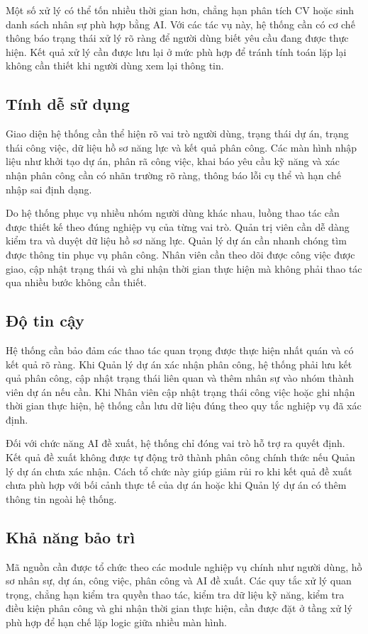 \documentclass[../DoAn.tex]{subfiles}
\begin{document}
Một số xử lý có thể tốn nhiều thời gian hơn, chẳng hạn phân tích CV hoặc sinh danh sách nhân sự phù hợp bằng AI. Với các tác vụ này, hệ thống cần có cơ chế thông báo trạng thái xử lý rõ ràng để người dùng biết yêu cầu đang được thực hiện. Kết quả xử lý cần được lưu lại ở mức phù hợp để tránh tính toán lặp lại không cần thiết khi người dùng xem lại thông tin.

\subsection{Tính dễ sử dụng}
\label{subsection:2.4.4}
Giao diện hệ thống cần thể hiện rõ vai trò người dùng, trạng thái dự án, trạng thái công việc, dữ liệu hồ sơ năng lực và kết quả phân công. Các màn hình nhập liệu như khởi tạo dự án, phân rã công việc, khai báo yêu cầu kỹ năng và xác nhận phân công cần có nhãn trường rõ ràng, thông báo lỗi cụ thể và hạn chế nhập sai định dạng.

Do hệ thống phục vụ nhiều nhóm người dùng khác nhau, luồng thao tác cần được thiết kế theo đúng nghiệp vụ của từng vai trò. Quản trị viên cần dễ dàng kiểm tra và duyệt dữ liệu hồ sơ năng lực. Quản lý dự án cần nhanh chóng tìm được thông tin phục vụ phân công. Nhân viên cần theo dõi được công việc được giao, cập nhật trạng thái và ghi nhận thời gian thực hiện mà không phải thao tác qua nhiều bước không cần thiết.

\subsection{Độ tin cậy}
\label{subsection:2.4.5}
Hệ thống cần bảo đảm các thao tác quan trọng được thực hiện nhất quán và có kết quả rõ ràng. Khi Quản lý dự án xác nhận phân công, hệ thống phải lưu kết quả phân công, cập nhật trạng thái liên quan và thêm nhân sự vào nhóm thành viên dự án nếu cần. Khi Nhân viên cập nhật trạng thái công việc hoặc ghi nhận thời gian thực hiện, hệ thống cần lưu dữ liệu đúng theo quy tắc nghiệp vụ đã xác định.

Đối với chức năng AI đề xuất, hệ thống chỉ đóng vai trò hỗ trợ ra quyết định. Kết quả đề xuất không được tự động trở thành phân công chính thức nếu Quản lý dự án chưa xác nhận. Cách tổ chức này giúp giảm rủi ro khi kết quả đề xuất chưa phù hợp với bối cảnh thực tế của dự án hoặc khi Quản lý dự án có thêm thông tin ngoài hệ thống.

\subsection{Khả năng bảo trì}
\label{subsection:2.4.6}
Mã nguồn cần được tổ chức theo các module nghiệp vụ chính như người dùng, hồ sơ nhân sự, dự án, công việc, phân công và AI đề xuất. Các quy tắc xử lý quan trọng, chẳng hạn kiểm tra quyền thao tác, kiểm tra dữ liệu kỹ năng, kiểm tra điều kiện phân công và ghi nhận thời gian thực hiện, cần được đặt ở tầng xử lý phù hợp để hạn chế lặp logic giữa nhiều màn hình.
\end{document}

